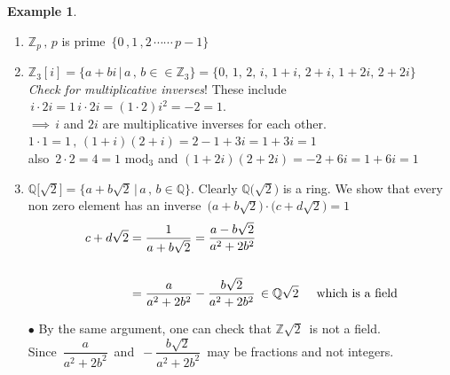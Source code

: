\documentclass[11pt,a4paper]{article}
\theoremstyle{definition}
\newtheorem{exa}[thm]{Example}
\begin{document}
\begin{exa}
\begin{enumerate}
\item $\mathbb{Z}_p\, ,\, p$ is prime $\, \{0\, , 1\, , 2\, \cdots\cdots \, p-1\}$
\item $\mathbb{Z}_3[i] = \big\{a + bi\, \big|\, a\, , \, b \in \in \mathbb{Z}_3\big\} = \{ 0,\, 1, \, 2, \, i, \, 1 +i,\, 2 + i, \, 1 + 2i,\, 2 + 2i\}$\\

\textit{Check for multiplicative inverses}! These include $\, i\cdot 2i = 1\, i\cdot 2i = (1\cdot 2)i^2  = -2 =1$.\\

$\implies\, i$ and $2i$ are multiplicative inverses for each other. $1\cdot 1 = 1\, , \, (1 + i)(2 + i) = 2 - 1 + 3i = 1 + 3i = 1\,$\\

also $\, 2\cdot 2 = 4 = 1$ mod$_3$ and $(1 + 2i)(2 + 2i) = -2 + 6i = 1 + 6i = 1$\\


\item $\mathbb{Q}\big[\sqrt{2}\big] = \big\{a + b\sqrt{2}\, \big|\, a\, ,\, b\in \mathbb{Q}\big\}$. Clearly $\mathbb{Q}\big(\sqrt{2}\big)$ is a ring. We show that every non zero element has an inverse $\, \big(a + b\sqrt{2}\big)\cdot \big(c + d\sqrt{2}\big) = 1$
\begin{align*}
c + d\sqrt{2} &  = \dfrac{1}{a + b\sqrt{2}} = \dfrac{a - b\sqrt{2}}{a^2 + 2b^2}\\\\
             &  = \dfrac{a}{a^2 + 2b^2} - \dfrac{b\sqrt{2}}{a^2 + 2b^2}\, \in \mathbb{Q} \sqrt{2}\hspace{0.5cm}\text{which is a field}\\
\end{align*}



$\bullet$ By the same argument, one can check that $\mathbb{Z}\sqrt{2}\,$ is not a field. \\

Since $\, \dfrac{a}{a^2 + 2b^2}\,$ and $\, - \dfrac{b\sqrt{2}}{a^2 + 2b^2}\,$ may be fractions and not integers.\\\\
\end{enumerate}
\end{exa}
\end{document}

